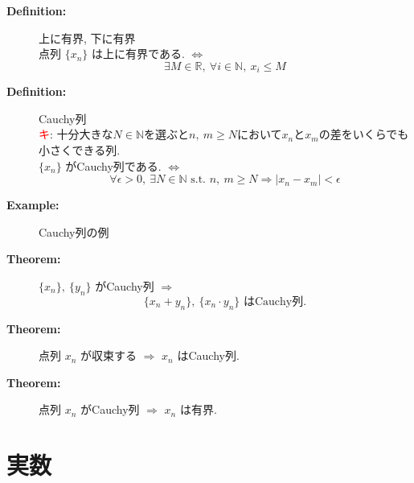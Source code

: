 \documentclass[english,dvipdfmx]{jsarticle}
\newcommand*{\point}{\textcircled{\textcolor{red}{\scriptsize キ}}}
\begin{document}
\begin{description}
        \item[\bf{Definition:}] 上に有界, 下に有界 \\
            点列 $\{ x_n \}$  は上に有界である. $\Leftrightarrow$
            \begin{equation*}
                \exists M \in \mathbb{R},\ \forall i \in \mathbb{N},\ x_i \leq M
            \end{equation*}

        \item[\bf{Definition:}] Cauchy列 \\
            \point : 十分大きな$N \in \mathbb{N}$を選ぶと$n,\ m \geq N$において$x_n$と$x_m$の差をいくらでも小さくできる列. \\
            $\{ x_n \}$ がCauchy列である. $\Leftrightarrow$
            \begin{equation*}
                \forall \epsilon > 0,\ \exists N \in \mathbb{N} \text{ s.t. } n,\ m \geq N \Rightarrow | x_n - x_m | < \epsilon
            \end{equation*}
        \item[\bf{Example:}] Cauchy列の例 \\
        \item[\bf{Theorem:}] $\{ x_n \} ,\ \{ y_n \}$ がCauchy列 $\Rightarrow$
            \begin{equation*}
                \{ x_n + y_n \} ,\ \{ x_n \cdot y_n \} \text{ はCauchy列.} 
            \end{equation*}
        \item[\bf{Theorem:}] 点列 $x_n$ が収束する $\Rightarrow$ $x_n$ はCauchy列.
        \item[\bf{Theorem:}] 点列 $x_n$ がCauchy列 $\Rightarrow$ $x_n$ は有界.
        
    \end{description}

\newpage
\section{実数}
\end{document}
